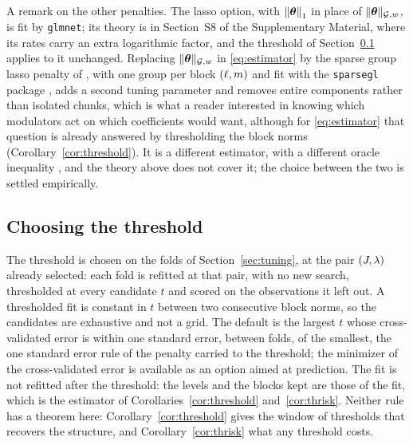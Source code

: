 A remark on the other penalties. The lasso option, with
$\left\lVert \boldsymbol{\theta} \right\rVert_1$ in place of $\lVert \boldsymbol{\theta}\rVert_{\mathcal{G},w}$, is fit by \texttt{glmnet}; its
theory is in Section~S8 of the Supplementary Material, where its rates carry
an extra logarithmic factor, and the threshold of Section~\ref{sec:threshold}
applies to it unchanged. Replacing $\lVert \boldsymbol{\theta}\rVert_{\mathcal{G},w}$ in
\eqref{eq:estimator} by the sparse group lasso penalty of
\citet{Simon-Friedman-Hastie-Tibshirani-2013}, with one group per block
$(\ell,m)$ and fit with the \texttt{sparsegl} package
\citep{Liang-Cohen-SolonHeinsfeld-Pestilli-McDonald-2024}, adds a second tuning parameter and removes entire components
rather than isolated chunks, which is what a reader interested in
knowing which modulators act on which coefficients would want, although for
 \eqref{eq:estimator} that question is already answered by thresholding the block
norms (Corollary~\ref{cor:threshold}). It is a
different estimator, with a different oracle inequality
\citep{Lounici-Pontil-vandeGeer-Tsybakov-2011}, and the theory above does not
cover it; the choice between the two is settled empirically.


\subsection{Choosing the threshold}
\label{sec:threshold}

The threshold is chosen on the folds of Section~\ref{sec:tuning}, at the pair
$(J,\lambda)$ already selected: each fold is refitted at that pair, with no new
search, thresholded at every candidate $t$ and scored on the observations it
left out. A thresholded fit is constant in $t$ between two consecutive block
norms, so the candidates are exhaustive and not a grid. The default is the
largest $t$ whose cross-validated error is within one standard error, between
folds, of the smallest, the one standard error rule of the penalty carried to
the threshold; the minimizer of the cross-validated error is available as an
option aimed at prediction. The fit is not refitted after the threshold: the
levels and the blocks kept are those of the fit, which is the estimator of
Corollaries~\ref{cor:threshold} and~\ref{cor:thrisk}. Neither rule has a
theorem here: Corollary~\ref{cor:threshold} gives the window of thresholds
that recovers the structure, and Corollary~\ref{cor:thrisk} what any threshold
costs.


